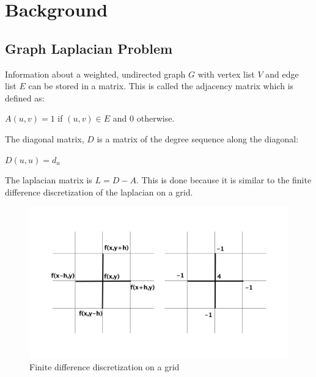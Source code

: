 \documentclass{article}
\begin{document}
\section{Background}
\subsection{Graph Laplacian Problem}
Information about a weighted, undirected graph $G$ with vertex list $V$ and edge list $E$ can be stored in a matrix. This is called the adjacency matrix which is defined as:\\
\begin{center} 
$A(u,v) = 1$ if $(u,v) \in E$ and $0$ otherwise.\\
\end{center}
The diagonal matrix, $D$ is a matrix of the degree sequence along the diagonal:\\
\begin{center}
$D(u,u) = d_u$
\end{center}
The laplacian matrix is $L = D-A$. This is done because it is similar to the finite difference discretization of the laplacian on a grid.\\
\begin{figure}
\begin{center}
\includegraphics[width=\linewidth]{laplace.png}
  \caption{Finite difference discretization on a grid}
  \end{center}
  \end{figure}\\
 
\end{document}
